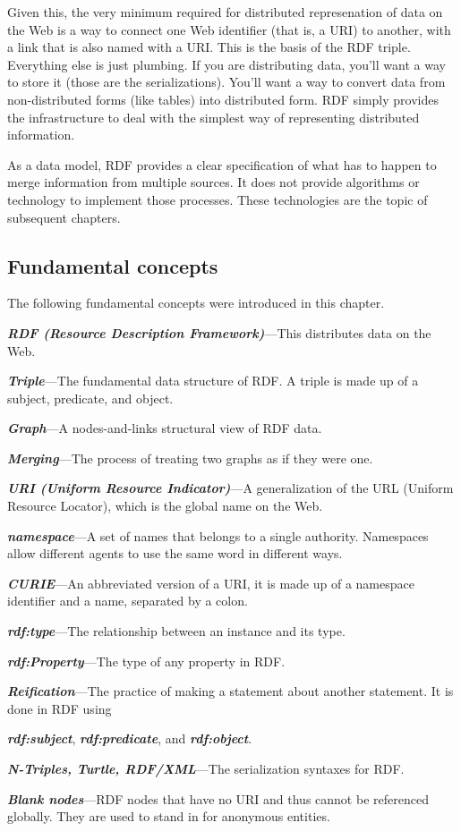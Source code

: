 Given this, the very minimum required for distributed represenation of data on the
Web is a way to connect one Web identifier (that is, a URI) to another, with a link that is also named with a URI.  This is the basis of the RDF triple.  Everything else is just plumbing.  If you are distributing data, 
you'll want a way to store it (those are the serializations).  You'll want a way to convert data
from non-distributed forms (like tables) into distributed form.  RDF simply provides the infrastructure to deal
with the simplest way of representing distributed information. 



As a data model, RDF provides a clear specification of what has to
happen to merge information from multiple sources. It does not provide
algorithms or technology to implement those processes. These
technologies are the topic of subsequent chapters.

\subsection{Fundamental concepts}

The following fundamental concepts were introduced in this chapter.

\emph{\textbf{RDF (Resource Description Framework)}}---This distributes
data on the Web.

\emph{\textbf{Triple}}---The fundamental data structure of RDF. A triple
is made up of a subject, predicate, and object.

\emph{\textbf{Graph}}---A nodes-and-links structural view of RDF data.

\emph{\textbf{Merging}}---The process of treating two graphs as if they
were one.

\emph{\textbf{URI (Uniform Resource Indicator)}}---A generalization of
the URL (Uniform Resource Locator), which is the global name on the Web.

\emph{\textbf{namespace}}---A set of names that belongs to a single authority.
Namespaces allow different agents to use the same word in different
ways.

\emph{\textbf{CURIE}}---An abbreviated version of a URI, it is made up of a
namespace identifier and a name, separated by a colon.

\emph{\textbf{rdf:type}}---The relationship between an instance and its type.

\emph{\textbf{rdf:Property}}---The type of any property in RDF.

\emph{\textbf{Reification}}---The practice of making a statement about another
statement. It is done in RDF using

\emph{\textbf{rdf:subject}}, \emph{\textbf{rdf:predicate}}, and \emph{\textbf{rdf:object}}.

\emph{\textbf{N-Triples, Turtle, RDF/XML}}---The serialization syntaxes for
RDF.

\emph{\textbf{Blank nodes}}---RDF nodes that have no URI and thus cannot be
referenced globally. They are used to stand in for anonymous entities.
